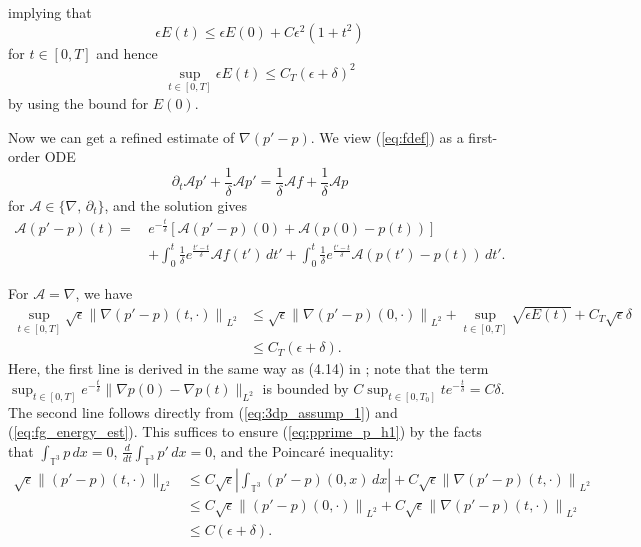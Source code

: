 \documentclass[reqno,10pt]{amsart}
\theoremstyle{definition}
\theoremstyle{remark}
\numberwithin{equation}{section}
\begin{document}
implying that
\[
    \epsilon E(t)\le \epsilon E(0) + C \epsilon^2(1+t^2)
\]
for $t\in[0,T]$ and hence
\begin{equation} \label{eq:fg_energy_est}
    \sup_{t\in[0,T]} \epsilon E(t) \le C_T(\epsilon+\delta)^2 
\end{equation}
by using the bound for $E(0)$.

Now we can get a refined estimate of $\nabla(p'-p)$. We view (\ref{eq:fdef}) as a first-order ODE
\[
    \partial_t \mathcal{A} p' + \frac{1}{\delta} \mathcal{A}p' = \frac{1}{\delta} \mathcal{A}f + \frac{1}{\delta} \mathcal{A}p
\]
for $\mathcal{A} \in \{\nabla,\, \partial_t\}$, and the solution gives
\begin{equation} \label{eq:Apprime_p}
\begin{split}
    \mathcal{A}(p'-p)(t) =\, & e^{-\frac{t}{\delta}} \left[	\mathcal{A}(p'-p)(0) + \mathcal{A}(p(0)-p(t)) \right] \\
    &+ \int^t_0 \frac{1}{\delta} e^{\frac{t'-t}{\delta}} \mathcal{A}f(t')\,dt'
    + \int^t_0 \frac{1}{\delta} e^{\frac{t'-t}{\delta}} \mathcal{A}(p(t')-p(t))\,dt'.
\end{split}
\end{equation}

For $\mathcal{A}=\nabla$, we have 
\[
\begin{aligned}
    \sup_{t\in[0,T]} \sqrt\epsilon{ \| \nabla(p'-p)(t,\cdot)\|}_{L^2} &\le \sqrt\epsilon{\| \nabla (p'-p)(0,\cdot)\|}_{L^2} + \sup_{t\in[0,T]} \sqrt{\epsilon E(t)} + C_T\sqrt\epsilon\delta \\
    &\le C_T(\epsilon+\delta).
\end{aligned}
\]
Here, the first line is derived in the same way as (4.14) in \cite{HRYZ25}; note that the term $\sup_{t\in[0,T]} e^{-\frac{t}{\delta}}\|\nabla p(0) - \nabla p(t) \|_{L^2}$ is bounded by $C\sup_{t\in[0,T_0]} te^{-\frac{t}{\delta}} = C\delta$. The second line follows directly from (\ref{eq:3dp_assump_1}) and (\ref{eq:fg_energy_est}). This suffices to ensure (\ref{eq:pprime_p_h1}) by the facts that $\int_{\mathbb T^3}p\,dx=0$, $\frac{d}{dt}\int_{\mathbb T^3} p'\,dx=0$, and the Poincar{\'e} inequality:
\[
\begin{aligned}
    \sqrt\epsilon\|(p'-p)(t,\cdot)\|_{L^2} &\le C\sqrt\epsilon\left| \int_{\mathbb T^3} (p'-p)(0,x)\,dx \right| + C\sqrt\epsilon{\|\nabla(p'-p)(t,\cdot)\|}_{L^2} \\
    &\le C\sqrt\epsilon{\|(p'-p)(0,\cdot)\|}_{L^2} + C\sqrt\epsilon{\|\nabla(p'-p)(t,\cdot)\|}_{L^2} \\
    &\le C(\epsilon+\delta).
\end{aligned}
\]
\end{document}
